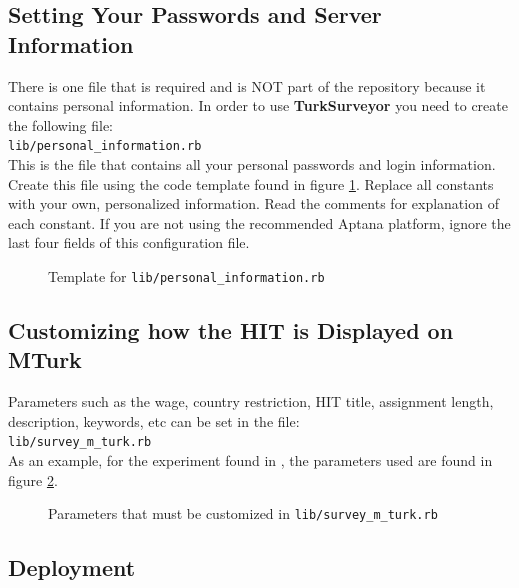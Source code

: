 \documentclass[12pt]{article}
\begin{document}
\subsection{Setting Your Passwords and Server Information}

There is one file that is required and is NOT part of the repository because it contains personal information. In order to use \textbf{TurkSurveyor} you need to create the following file:\\

\texttt{lib/personal\_information.rb} \\

This is the file that contains all your personal passwords and login information. Create this file using the code template found in figure  \ref{code:personal_information.rb}. Replace all constants with your own, personalized information. Read the comments for explanation of each constant. If you are not using the recommended Aptana platform, ignore the last four fields of this configuration file.

\begin{figure}[htp]
\centering

\caption{Template for \texttt{lib/personal\_information.rb}}
\label{code:personal_information.rb}
\end{figure}

\subsection{Customizing how the HIT is Displayed on MTurk}

Parameters such as the wage, country restriction, HIT title, assignment length, description, keywords, etc can be set in the file:\\

\texttt{lib/survey\_m\_turk.rb} \\

As an example, for the experiment found in \citet{KapelnerChandler2010}, the parameters used are found in figure \ref{code:survey_turk_relevant.rb}.

\begin{figure}[htp]
\centering

\caption{Parameters that must be customized in {\texttt{lib/survey\_m\_turk.rb}}}
\label{code:survey_turk_relevant.rb}
\end{figure}


\subsection{Deployment}\label{subsec:deployment}
\end{document}
